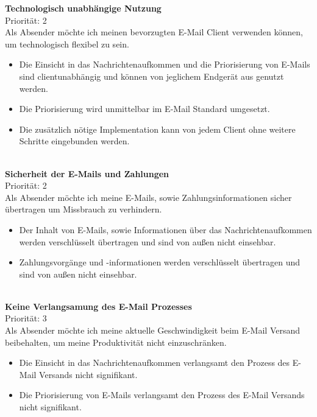 \noindent 
\textbf{Technologisch unabhängige Nutzung} \\
Priorität: 2 \\
Als Absender möchte ich meinen bevorzugten E-Mail Client verwenden können, um technologisch flexibel zu sein.
\begin{itemize}
    \item Die Einsicht in das Nachrichtenaufkommen und die Priorisierung von E-Mails sind clientunabhängig und können von jeglichem Endgerät aus genutzt werden.
    \item Die Priorisierung wird unmittelbar im E-Mail Standard umgesetzt.
    \item Die zusätzlich nötige Implementation kann von jedem Client ohne weitere Schritte eingebunden werden.
\end{itemize}

\noindent 
\\ \textbf{Sicherheit der E-Mails und Zahlungen} \\
Priorität: 2 \\
Als Absender möchte ich meine E-Mails, sowie Zahlungsinformationen sicher übertragen um Missbrauch zu verhindern.
\begin{itemize}
    \item Der Inhalt von E-Mails, sowie Informationen über das Nachrichtenaufkommen werden verschlüsselt übertragen und sind von außen nicht einsehbar.
    \item Zahlungsvorgänge und -informationen werden verschlüsselt übertragen und sind von außen nicht einsehbar.
\end{itemize}

\noindent 
\\ \textbf{Keine Verlangsamung des E-Mail Prozesses} \\
Priorität: 3 \\
Als Absender möchte ich meine aktuelle Geschwindigkeit beim E-Mail Versand beibehalten, um meine Produktivität nicht einzuschränken.
\begin{itemize}
    \item Die Einsicht in das Nachrichtenaufkommen verlangsamt den Prozess des E-Mail Versands nicht signifikant.
    \item Die Priorisierung von E-Mails verlangsamt den Prozess des E-Mail Versands nicht signifikant.
\end{itemize}


